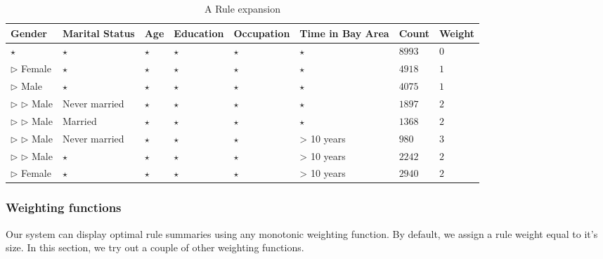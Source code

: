 \begin{table} 
\centering 
\begin{tabular}{| p{1.5cm} | p{1.5cm} | p{1.5cm} | p{1.5cm} | p{1.5cm} | p{1.5cm} | l | l |} 
\hline Gender & Marital Status & Age & Education & Occupation & Time in Bay Area & Count & Weight \\ \hline 
\cline{1-8} $\star$ & $\star$ & $\star$ & $\star$ & $\star$ & $\star$ & $8993$ & $0$ \\
\cline{1-1} \cline{2-2} \cline{3-3} \cline{4-4} \cline{5-5} \cline{6-6} \cline{7-8} $\triangleright$ Female & $\star$ & $\star$ & $\star$ & $\star$ & $\star$ & $4918$ & $1$ \\
\cline{1-1} \cline{2-2} \cline{3-3} \cline{4-4} \cline{5-5} \cline{6-6} \cline{7-8} $\triangleright$ Male & $\star$ & $\star$ & $\star$ & $\star$ & $\star$ & $4075$ & $1$ \\
\cline{2-2} \cline{3-3} \cline{4-4} \cline{5-5} \cline{6-6} \cline{7-8} $\triangleright$ $\triangleright$ Male & Never married & $\star$ & $\star$ & $\star$ & $\star$ & $1897$ & $2$ \\
\cline{2-2} \cline{3-3} \cline{4-4} \cline{5-5} \cline{6-6} \cline{7-8} $\triangleright$ $\triangleright$ Male & Married & $\star$ & $\star$ & $\star$ & $\star$ & $1368$ & $2$ \\
\cline{2-2} \cline{3-3} \cline{4-4} \cline{5-5} \cline{6-6} \cline{7-8} $\triangleright$ $\triangleright$ Male & Never married & $\star$ & $\star$ & $\star$ & > 10 years & $980$ & $3$ \\
\cline{2-2} \cline{3-3} \cline{4-4} \cline{5-5} \cline{6-6} \cline{7-8} $\triangleright$ $\triangleright$ Male & $\star$ & $\star$ & $\star$ & $\star$ & > 10 years & $2242$ & $2$ \\
\cline{1-1} \cline{2-2} \cline{3-3} \cline{4-4} \cline{5-5} \cline{6-6} \cline{7-8} $\triangleright$ Female & $\star$ & $\star$ & $\star$ & $\star$ & > 10 years & $2940$ & $2$ \\
\hline 
\end{tabular} 
\caption{A Rule expansion \label{table:uiexamplerule}} 
\end{table} 

\subsubsection{Weighting functions}
Our system can display optimal rule summaries using any monotonic weighting function. By default, we assign a rule weight equal to it's size. In this section, we try out a couple of other weighting functions. 

